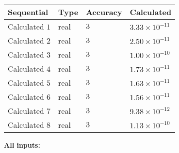 \documentclass[12pt]{article}
\begin{document}
   
   
   
\noindent{}
   
   
  
  
\noindent\begin{tabular}{|l|l|l|l|}
\hline
 Sequential & Type & Accuracy & Calculated \\ 
\hline
 
 
  Calculated $           1$ & real & $           3 $ & 
 $ 3.33 \times 10^{-11} $ 
 \\  \hline  
 
 
  Calculated $           2$ & real & $           3 $ & 
 $ 2.50 \times 10^{-11} $ 
 \\  \hline  
 
 
  Calculated $           3$ & real & $           3 $ & 
 $ 1.00 \times 10^{-10} $ 
 \\  \hline  
 
 
  Calculated $           4$ & real & $           3 $ & 
 $ 1.73 \times 10^{-11} $ 
 \\  \hline  
 
 
  Calculated $           5$ & real & $           3 $ & 
 $ 1.63 \times 10^{-11} $ 
 \\  \hline  
 
 
  Calculated $           6$ & real & $           3 $ & 
 $ 1.56 \times 10^{-11} $ 
 \\  \hline  
 
 
  Calculated $           7$ & real & $           3 $ & 
 $ 9.38 \times 10^{-12} $ 
 \\  \hline  
 
 
  Calculated $           8$ & real & $           3 $ & 
 $ 1.13 \times 10^{-10} $ 
 \\  \hline  
 \end{tabular}
   
   
   
   
\noindent\vspace{0.1in}\hspace{-0.08in} {\textbf{\Large{All inputs: }}}
   
   
  
\end{document}
